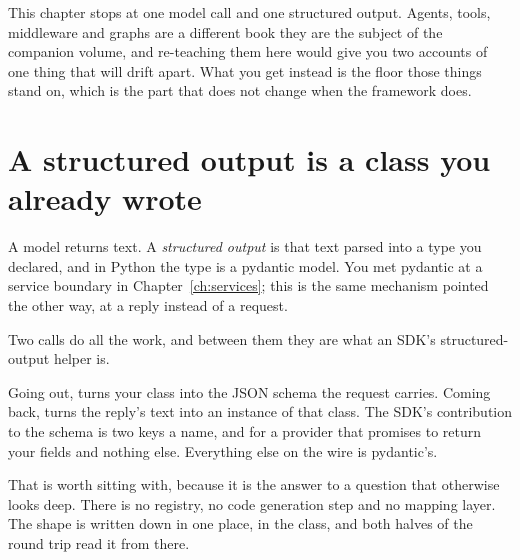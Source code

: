 This chapter stops at one model call and one structured output. Agents,
tools, middleware and graphs are a different book \dash{} they are the
subject of the companion volume, and re-teaching them here would give you
two accounts of one thing that will drift apart. What you get instead is
the floor those things stand on, which is the part that does not change
when the framework does.

\section{A structured output is a class you already wrote}
\label{sec:ai-structured}

A model returns text. A \emph{structured output} is that text parsed into a
type you declared, and in Python the type is a pydantic model. You met
pydantic at a service boundary in Chapter~\ref{ch:services}; this is the
same mechanism pointed the other way, at a reply instead of a request.


Two calls do all the work, and between them they are what an SDK's
structured-output helper is.



Going out,  turns your class into the JSON
schema the request carries. Coming back,
turns the reply's text into an instance of that class. The SDK's
contribution to the schema is two keys \dash{} a name, and
 for a provider that promises to return
your fields and nothing else. Everything else on the wire is pydantic's.

That is worth sitting with, because it is the answer to a question that
otherwise looks deep. There is no registry, no code generation step and no
mapping layer. The shape is written down in one place, in the class, and
both halves of the round trip read it from there.

